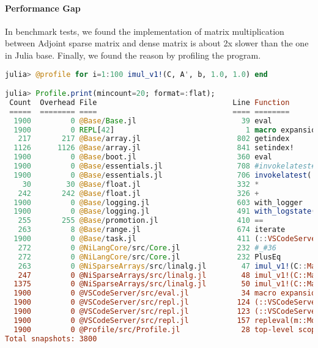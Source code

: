 \paragraph{Performance Gap} In benchmark tests, we found the implementation of matrix multiplication between 
Adjoint sparse matrix and dense matrix is about 2x slower than the one in Julia base. Finally,
we found the reason by profiling the program.
\begin{lstlisting}[language=Julia]
julia> @profile for i=1:100 imul_v1!(C, A', b, 1.0, 1.0) end

julia> Profile.print(mincount=20; format=:flat);
 Count  Overhead File                               Line Function
 =====  ======== ====                               ==== ========
  1900         0 @Base/Base.jl                        39 eval
  1900         0 REPL[42]                              1 macro expansion
   217       217 @Base/array.jl                      802 getindex
  1126      1126 @Base/array.jl                      841 setindex!
  1900         0 @Base/boot.jl                       360 eval
  1900         0 @Base/essentials.jl                 708 #invokelatest#2
  1900         0 @Base/essentials.jl                 706 invokelatest(::Any)
    30        30 @Base/float.jl                      332 *
   242       242 @Base/float.jl                      326 +
  1900         0 @Base/logging.jl                    603 with_logger
  1900         0 @Base/logging.jl                    491 with_logstate(f::Function, logstate::Any)
   255       255 @Base/promotion.jl                  410 ==
   263         8 @Base/range.jl                      674 iterate
  1900         0 @Base/task.jl                       411 (::VSCodeServer.var"#53#54")()
   272         0 @NiLangCore/src/Core.jl             232 #_#36
   272         0 @NiLangCore/src/Core.jl             232 PlusEq
   263         0 @NiSparseArrays/src/linalg.jl        47 imul_v1!(C::Matrix{Float64}, xA::LinearAlgebra.Adjoint{Float64, SparseMatrixCSC{Float64, Int64}}, B::Matrix{Fl...
   247         0 @NiSparseArrays/src/linalg.jl        48 imul_v1!(C::Matrix{Float64}, xA::LinearAlgebra.Adjoint{Float64, SparseMatrixCSC{Float64, Int64}}, B::Matrix{Fl...
  1375         0 @NiSparseArrays/src/linalg.jl        50 imul_v1!(C::Matrix{Float64}, xA::LinearAlgebra.Adjoint{Float64, SparseMatrixCSC{Float64, Int64}}, B::Matrix{Fl...
  1900         0 @VSCodeServer/src/eval.jl            34 macro expansion
  1900         0 @VSCodeServer/src/repl.jl           124 (::VSCodeServer.var"#68#70"{Module, Expr, REPL.LineEditREPL, REPL.LineEdit.Prompt})()
  1900         0 @VSCodeServer/src/repl.jl           123 (::VSCodeServer.var"#69#71"{Module, Expr, REPL.LineEditREPL, REPL.LineEdit.Prompt})()
  1900         0 @VSCodeServer/src/repl.jl           157 repleval(m::Module, code::Expr, #unused#::String)
  1900         0 @Profile/src/Profile.jl              28 top-level scope
Total snapshots: 3800

\end{lstlisting}

